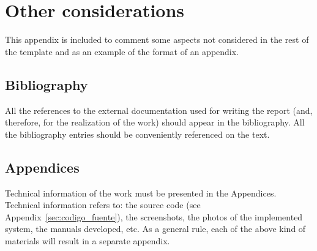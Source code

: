 %
%
%

\chapter{Other considerations}

This appendix is included to comment some aspects not considered in the rest of the template and as an example of the format of an appendix.

\section{Bibliography}

All the references to the external documentation used for writing the report (and, therefore, for the realization of the work) should appear in the bibliography. All the bibliography entries should be conveniently referenced on the text.

\section{Appendices}

Technical information of the work must be presented in the Appendices. Technical information refers to: the source code (see Appendix~\ref{sec:codigo_fuente}), the screenshots, the photos of the implemented system, the manuals developed, etc. As a general rule, each of the above kind of materials will result in a separate appendix.

